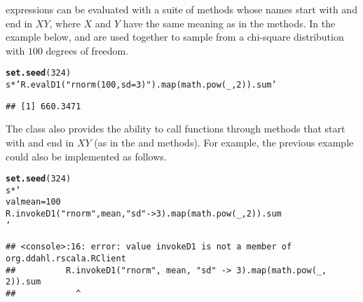 \documentclass[article]{jss}\usepackage[]{graphicx}\usepackage[]{color}
\makeatletter
\newcommand{\hlnum}[1]{\textcolor[rgb]{0.686,0.059,0.569}{#1}}%
\newcommand{\hlstr}[1]{\textcolor[rgb]{0.192,0.494,0.8}{#1}}%
\newcommand{\hlopt}[1]{\textcolor[rgb]{0,0,0}{#1}}%
\newcommand{\hlstd}[1]{\textcolor[rgb]{0.345,0.345,0.345}{#1}}%
\newcommand{\hlkwd}[1]{\textcolor[rgb]{0.737,0.353,0.396}{\textbf{#1}}}%
\newenvironment{kframe}{%
 \def\at@end@of@kframe{}%
 \ifinner\ifhmode%
  \def\at@end@of@kframe{\end{minipage}}%
  \begin{minipage}{\columnwidth}%
 \fi\fi%
 \def\FrameCommand##1{\hskip\@totalleftmargin \hskip-\fboxsep
 \colorbox{shadecolor}{##1}\hskip-\fboxsep
     \hskip-\linewidth \hskip-\@totalleftmargin \hskip\columnwidth}%
 \MakeFramed {\advance\hsize-\width
   \@totalleftmargin\z@ \linewidth\hsize
   \@setminipage}}%
 {\par\unskip\endMakeFramed%
 \at@end@of@kframe}
\newenvironment{knitrout}{}{} %
\newcommand{\R}{\proglang{R}\xspace}
\newcommand{\Scala}{\proglang{Scala}\xspace}
\makeatother
\begin{document}
\R expressions can be evaluated with a suite of methods whose names start with
 and end in $XY$, where $X$ and $Y$ have the same meaning as in the
 methods.  In the example below, \R and \Scala are used together to
sample from a chi-square distribution with $100$ degrees of freedom.

\begin{knitrout}\small
{}\color{fgcolor}\begin{kframe}
\begin{alltt}
\hlkwd{set.seed}\hlstd{(}\hlnum{324}\hlstd{)}
\hlstd{s} \hlopt{*} \hlstr{'R.evalD1("rnorm(100, sd=3)").map(math.pow(_, 2)).sum'}
\end{alltt}
\begin{verbatim}
## [1] 660.3471
\end{verbatim}
\end{kframe}
\end{knitrout}

The  class also provides the ability to call \R functions through
methods that start with  and end in $XY$ (as in the  and
 methods).  For example, the previous example could also be
implemented as follows.

\begin{knitrout}\small
{}\color{fgcolor}\begin{kframe}
\begin{alltt}
\hlkwd{set.seed}\hlstd{(}\hlnum{324}\hlstd{)}
\hlstd{s} \hlopt{*} \hlstr{'
  val mean = 100
  R.invokeD1("rnorm", mean, "sd" -> 3).map(math.pow(_, 2)).sum
'}
\end{alltt}
\begin{verbatim}
## <console>:16: error: value invokeD1 is not a member of org.ddahl.rscala.RClient
##          R.invokeD1("rnorm", mean, "sd" -> 3).map(math.pow(_, 2)).sum
##            ^
\end{verbatim}


{\ttfamily\noindent\bfseries{}}\end{kframe}
\end{knitrout}
\end{document}

